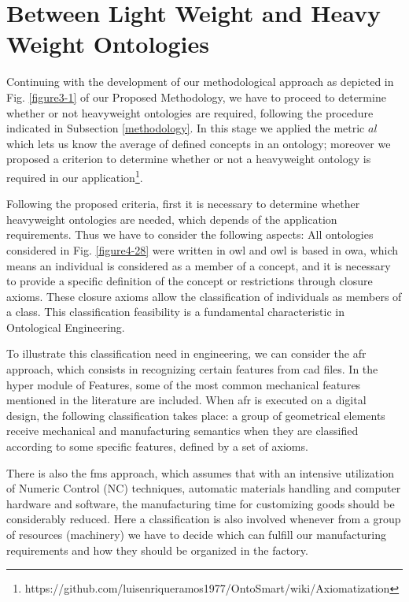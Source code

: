 \section{Between Light Weight and Heavy Weight Ontologies}\label{section4.3}


Continuing with the development of our methodological approach as depicted in Fig. \ref{figure3-1} of our Proposed Methodology, we have to proceed to determine whether or not heavyweight ontologies are required, following the procedure indicated in Subsection \ref{methodology}. In this stage we applied the metric $al$ which lets us know the average of defined concepts in an ontology; moreover we proposed a criterion to determine whether or not a heavyweight ontology is required in our application\footnote{https://github.com/luisenriqueramos1977/OntoSmart/wiki/Axiomatization}. 

Following the proposed criteria, first it is necessary to determine whether heavyweight ontologies are needed, which depends of the application requirements. Thus we have to consider the following aspects: All ontologies considered in Fig. \ref{figure4-28} were written in  \gls{owl} and \gls{owl} is based in \gls{owa}, which means an individual is considered as a member of a concept, and it is necessary to provide a specific definition of the concept or restrictions through  closure axioms. These closure axioms allow the classification of individuals as members of a class. This classification feasibility is a fundamental characteristic in Ontological Engineering.  

To illustrate this classification need in engineering, we can   consider the \gls{afr} approach, which consists in recognizing certain features from \gls{cad} files. In the hyper module of Features, some of the most common mechanical features mentioned in the literature are included. When \gls{afr} is executed on a digital design, the following classification takes place: a group of geometrical elements receive mechanical and manufacturing semantics when they are classified according to some specific features, defined by a set of axioms. 

There is also the \gls{fms} approach, which assumes that with an intensive utilization of Numeric Control (NC) techniques, automatic materials handling and computer hardware and software, the manufacturing time for customizing goods should be considerably reduced. Here a classification is also involved whenever from a group of resources (machinery) we have to decide which can fulfill our manufacturing requirements   and how they should be organized in the factory. 

